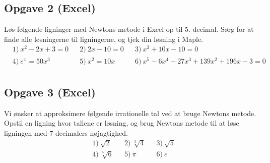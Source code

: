 \subsection*{Opgave 2 (Excel)}
Løs følgende ligninger med Newtons metode i Excel op til 5. decimal. Sørg for at finde alle løsningerne til ligningerne, og tjek din løsning i Maple.
\begin{align*}
	&1) \ x^2 - 2x + 3 = 0 & &2) \ 2x - 10 = 0  &
	 &3) \ x^3 + 10x - 10 = 0  \\
	&4) \ e^x = 50x^3  & &5) \ x^2 = 10x  & &6) \ 
	x^5 - 6 x^4 - 27x^3 + 139 x^2 + 196 x - 3 = 0  \\
\end{align*}

\subsection*{Opgave 3 (Excel)}
Vi ønsker at approksimere følgende irrationelle tal ved at bruge Newtons metode. Opstil en ligning hvor tallene er løsning, og brug Newtons metode til at løse ligningen med 7 decimalers nøjagtighed. 
\begin{align*}
	&1) \ \sqrt{2} & &2) \ \sqrt[3]{4}  &
	 &3) \ \sqrt{5} \\
	&4) \ \sqrt[7]{6}  &  &5) \ \pi  & &6)  \ e
	  \\
\end{align*}